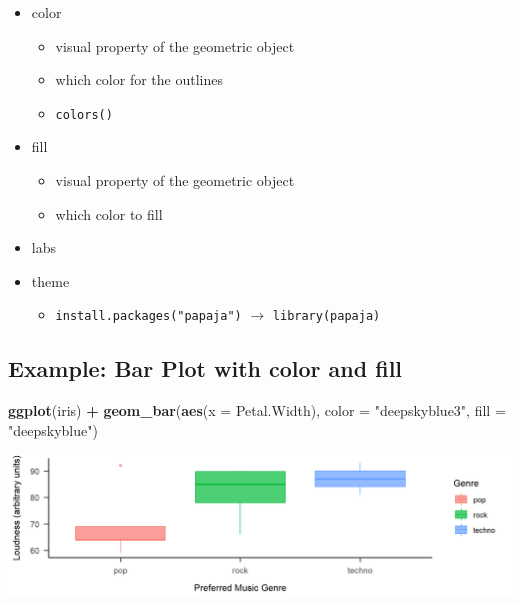 \documentclass[
]{book}
\newenvironment{Shaded}{\begin{snugshade}}{\end{snugshade}}
\newcommand{\AttributeTok}[1]{\textcolor[rgb]{0.13,0.29,0.53}{#1}}
\newcommand{\FunctionTok}[1]{\textcolor[rgb]{0.13,0.29,0.53}{\textbf{#1}}}
\newcommand{\NormalTok}[1]{#1}
\newcommand{\SpecialCharTok}[1]{\textcolor[rgb]{0.81,0.36,0.00}{\textbf{#1}}}
\newcommand{\StringTok}[1]{\textcolor[rgb]{0.31,0.60,0.02}{#1}}
\providecommand{\tightlist}{%
  \setlength{\itemsep}{0pt}\setlength{\parskip}{0pt}}
\begin{document}
\begin{itemize}
\tightlist
\item
  color

  \begin{itemize}
  \tightlist
  \item
    visual property of the geometric object
  \item
    which color for the outlines
  \item
    \texttt{colors()}
  \end{itemize}
\item
  fill

  \begin{itemize}
  \tightlist
  \item
    visual property of the geometric object
  \item
    which color to fill
  \end{itemize}
\item
  labs
\item
  theme

  \begin{itemize}
  \tightlist
  \item
    \texttt{install.packages("papaja")} \(\rightarrow\) \texttt{library(papaja)}
  \end{itemize}
\end{itemize}

\subsection{Example: Bar Plot with color and fill}\label{example-bar-plot-with-color-and-fill}

\begin{Shaded}
\begin{Highlighting}[]
\FunctionTok{ggplot}\NormalTok{(iris) }\SpecialCharTok{+} 
  \FunctionTok{geom\_bar}\NormalTok{(}\FunctionTok{aes}\NormalTok{(}\AttributeTok{x =}\NormalTok{ Petal.Width), }\AttributeTok{color =} \StringTok{"deepskyblue3"}\NormalTok{, }\AttributeTok{fill =} \StringTok{"deepskyblue"}\NormalTok{)}
\end{Highlighting}
\end{Shaded}

\begin{flushleft}\includegraphics{_main_files/figure-html/unnamed-chunk-36-1} \end{flushleft}
\end{document}
